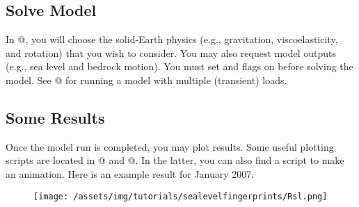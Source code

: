 \subsection{Solve Model} %
In @, you will choose the solid-Earth physics (e.g., gravitation, viscoelasticity, and
rotation) that you wish to consider. You may also request model outputs (e.g., sea level and bedrock
motion). You must set \verb@masstransport@ and \verb@slc@ flags on before solving the \verb@transient@
model. See @ for running a model with multiple (transient) loads.
\subsection{Some Results} %
Once the model run is completed, you may plot results. Some useful plotting scripts are located in
@ and @. In the latter, you can also find a script to make an animation.
Here is an example result for January 2007:
\begin{figure}[H]
	\begin{center}
		\texttt{[image: /assets/img/tutorials/sealevelfingerprints/Rsl.png]}
	\end{center}
\end{figure}

